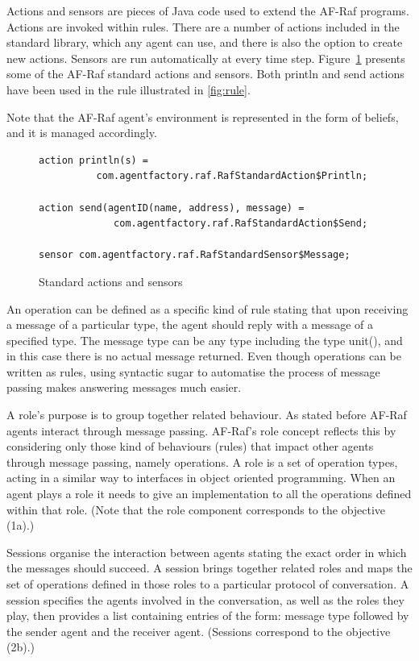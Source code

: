 \documentclass[a4paper,12pt,oneside,fleqn]{book} %
\begin{document}
Actions and sensors are pieces of Java code used to extend the AF-Raf
programs. Actions are invoked within rules. There are a number of actions
included in the standard library, which any agent can use, and there is also
the option to create new actions. Sensors are run automatically at every time
step. Figure~\ref{fig:actions-sensors} presents some of the AF-Raf standard
actions and sensors. Both {\sf println} and {\sf send} actions have been
used in the rule illustrated in \autoref{fig:rule}.

Note that the AF-Raf agent's environment is represented in the form of
beliefs, and it is managed accordingly.

\begin{figure}\footnotesize %
\begin{verbatim}
action println(s) =
          com.agentfactory.raf.RafStandardAction$Println;

action send(agentID(name, address), message) =
             com.agentfactory.raf.RafStandardAction$Send;

sensor com.agentfactory.raf.RafStandardSensor$Message;
\end{verbatim}
\caption{Standard actions and sensors}
\label{fig:actions-sensors}
\end{figure} %


An operation can be defined as a specific kind of rule stating that upon
receiving a message of a particular type, the agent should reply with a
message of a specified type. The message type can be any type including the
type unit(), and in this case there is no actual message returned. Even
though operations can be written as rules, using syntactic sugar to
automatise the process of message passing makes answering messages much
easier.

A role's purpose is to group together related behaviour. As stated before
AF-Raf agents interact through message passing. AF-Raf's role concept
reflects this by considering only those kind of behaviours (rules) that
impact other agents through message passing, namely operations. A role is a
set of operation types, acting in a similar way to interfaces in object
oriented programming. When an agent plays a role it needs to give an
implementation to all the operations defined within that role. (Note that
the role component corresponds to the objective (1a).)

Sessions organise the interaction between agents stating the exact order in
which the messages should succeed. A session brings together related roles
and maps the set of operations defined in those roles to a particular
protocol of conversation. A session specifies the agents involved in the
conversation, as well as the roles they play, then provides a list
containing entries of the form: message type followed by the sender agent
and the receiver agent. (Sessions correspond to the objective (2b).)
\end{document}
